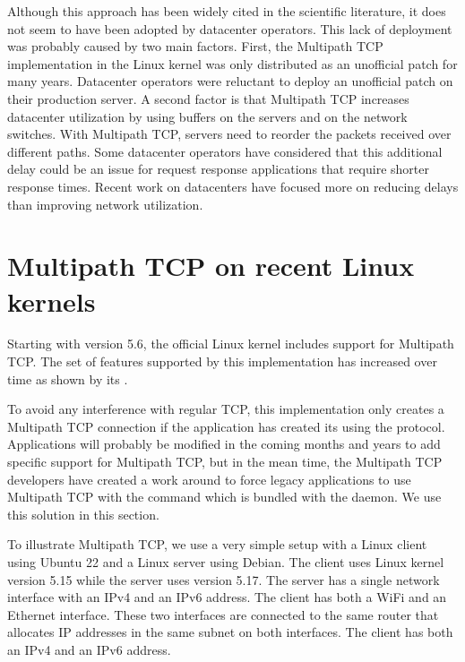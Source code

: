 \documentclass[letterpaper,10pt,english]{sphinxmanual}
\begin{document}
\sphinxAtStartPar
Although this approach has been widely cited in the scientific literature, it does not seem to have been adopted by datacenter operators. This lack of deployment was probably caused by two main factors. First, the Multipath TCP implementation in the Linux kernel was only distributed as an unofficial patch for many years. Datacenter operators were reluctant to deploy an unofficial patch on their production server. A second factor is that Multipath TCP increases datacenter utilization by using buffers on the servers and on the network switches. With Multipath TCP, servers need to reorder the packets received over different paths. Some datacenter operators have considered that this additional delay could be an issue for request response applications that require shorter response times. Recent work on datacenters have focused more on reducing delays than improving network utilization.


\chapter{Multipath TCP on recent Linux kernels}
\label{\detokenize{mptcp-linux:multipath-tcp-on-recent-linux-kernels}}\label{\detokenize{mptcp-linux::doc}}
\sphinxAtStartPar
Starting with version 5.6, the official Linux kernel includes support for Multipath TCP. The set of features supported by this implementation has increased over time as shown by its .

\sphinxAtStartPar
To avoid any interference with regular TCP, this implementation only creates a Multipath TCP connection if the application has created its  using the  protocol. Applications will probably be modified in the coming months and years to add specific support for Multipath TCP, but in the mean time, the Multipath TCP developers have created a work around to force legacy applications to use Multipath TCP with the  command which is bundled with the  daemon. We use this solution in this section.

\sphinxAtStartPar
To illustrate Multipath TCP, we use a very simple setup with a Linux client using Ubuntu 22 and a Linux server using Debian. The client uses Linux kernel version 5.15 while the server uses version 5.17. The server has a single network interface with an IPv4 and an IPv6 address. The client has both a Wi\sphinxhyphen{}Fi and an Ethernet interface. These two interfaces are connected to the same router that allocates IP addresses in the same subnet on both interfaces. The client has both an IPv4 and an IPv6 address.
\end{document}
